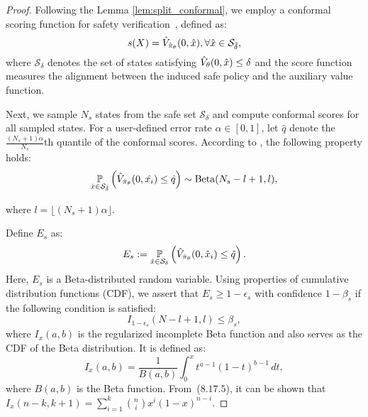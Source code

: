 \begin{proof}
    Following the Lemma \ref{lem:split_conformal}, we employ a conformal scoring function for safety verification~\cite{pmlr-v242-lin24a}, defined as:
\begin{equation*}
    s(X) = \hat{V}_{\hat{\pi}_{\theta}}(0, \hat{x}),    \forall \hat{x} \in \mathcal{S}_{\tilde\delta},
\end{equation*}
where $\mathcal{S}_{\delta}$ denotes the set of states satisfying $\hat{V}_{\theta}(0, \hat{x}) \leq \delta$ and the score function measures the alignment between the induced safe policy and the auxiliary value function.

Next, we sample $N_s$ states from the safe set $\mathcal{S}_{\delta}$ and compute conformal scores for all sampled states. For a user-defined error rate $\alpha \in [0, 1]$, let $\hat{q}$ denote the $\frac{(N_s+1)\alpha}{N_s}$th quantile of the conformal scores. According to \cite{vovk2012}, the following property holds:
\begin{equation}
    \underset{\hat{x} \in \mathcal{S}_{\tilde\delta}}{\mathbb{P}}\left(\hat{V}_{\hat{\pi}_{\theta}}(0, \hat{x_i}) \leq \hat{q} \right) \sim \text{Beta}(N_s - l + 1, l),    
\end{equation}

where $l = \lfloor (N_s+1)\alpha \rfloor $.

Define $E_s$  as:
\begin{equation*}
    E_s := \underset{\hat{x} \in \mathcal{S}_{\delta}}{\mathbb{P}}\left(\hat{V}_{\hat{\pi}_{\theta}}(0, \hat{x}_i) \leq \hat{q}\right).
\end{equation*}
Here, $E_s$ is a Beta-distributed random variable. Using properties of cumulative distribution functions (CDF), we assert that $E_s \geq 1 - \epsilon_s$ with confidence $1 - \beta_s$ if the following condition is satisfied:
\begin{equation} \label{eq:eps_calc_safe}
    I_{1-\epsilon_s}(N - l + 1, l) \leq \beta_s,
\end{equation}
where $I_x(a,b)$ is the regularized incomplete Beta function and also serves as the CDF of the Beta distribution. It is defined as:
\begin{equation*}
    I_x(a, b) = \frac{1}{B(a, b)} \int_{0}^{x} t^{a - 1} (1 - t)^{b - 1} \, dt,
\end{equation*}
where $B(a, b)$  is the Beta function. From~\cite{DLMF}($8.17.5$), it can be shown that $I_x(n-k, k+1) = \sum_{i=1}^{k} \binom{n}{i} x^i (1 - x)^{n - i}$.



\end{proof}
